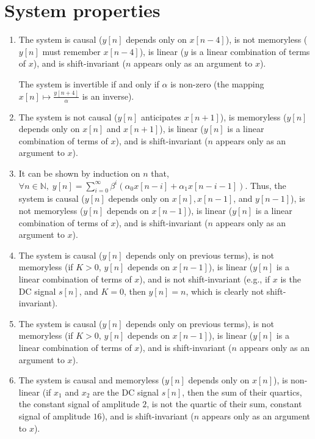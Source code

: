\documentclass[11pt]{article}
\newcommand{\N}{\mathbb{N}} %
\begin{document}
\section{System properties}
\begin{enumerate}
\item The system is causal ($y[n]$ depends only on $x[n - 4]$), is not
memoryless ($y[n]$ must remember $x[n - 4]$), is linear ($y$ is a linear
combination of terms of $x$), and is shift-invariant ($n$ appears only as an
argument to $x$).

The system is invertible if and only if $\alpha$ is non-zero (the mapping
$x[n] \mapsto \frac{y[n + 4]}{\alpha}$ is an inverse).
 
\item
The system is not causal ($y[n]$ anticipates $x[n + 1]$), is memoryless ($y[n]$
depends only on $x[n]$ and $x[n + 1]$), is linear ($y[n]$ is a linear
combination of terms of $x$), and is shift-invariant ($n$ appears only as an
argument to $x$).
 
\item
It can be shown by induction on $n$ that, $\forall n \in \N,\;y[n] = \sum_{i =
0}^{\infty} \beta^i(\alpha_0 x[n - i] + \alpha_1 x[n - i - 1])$. Thus, the 
system is causal ($y[n]$ depends only on $x[n], x[n - 1]$, and $y[n - 1]$),
is not memoryless ($y[n]$ depends on $x[n - 1]$), is linear ($y[n]$ is a linear
combination of terms of $x$), and is shift-invariant ($n$ appears only as an
argument to $x$).
 
\item 
The system is causal ($y[n]$ depends only on previous terms), is not memoryless
(if $K > 0$, $y[n]$ depends on $x[n - 1]$), is linear ($y[n]$ is a linear
combination of terms of $x$), and is not shift-invariant (e.g., if $x$ is the
DC signal $s[n]$, and $K = 0$, then $y[n] = n$, which is clearly not
shift-invariant).

\item
The system is causal ($y[n]$ depends only on previous terms), is not memoryless
(if $K > 0$, $y[n]$ depends on $x[n - 1]$), is linear ($y[n]$ is a linear
combination of terms of $x$), and is shift-invariant ($n$ appears only as an
argument to $x$).


\item The system is causal and memoryless ($y[n]$ depends only on $x[n]$), is
non-linear (if $x_1$ and $x_2$ are the DC signal $s[n]$, then the sum of their
quartics, the constant signal of amplitude $2$, is not the quartic of their
sum, constant signal of amplitude $16$), and is shift-invariant ($n$ appears
only as an argument to $x$).

\end{enumerate}
\end{document}
